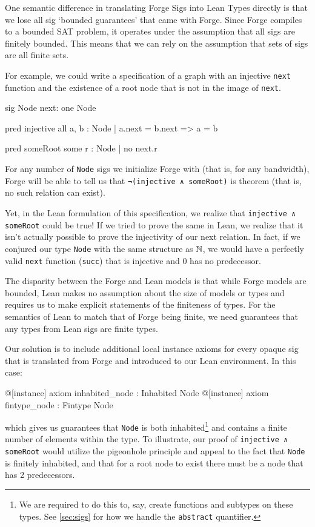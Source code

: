 One semantic difference in translating Forge Sigs into Lean Types directly is that we lose all sig `bounded guarantees' that came with Forge. Since Forge compiles to a bounded SAT problem, it operates under the assumption that all sigs are finitely bounded. This means that we can rely on the assumption that sets of sigs are all finite sets. 

For example, we could write a specification of a graph with an injective \texttt{next} function and the existence of a root node that is not in the image of \texttt{next}. 
\begin{forge*}
sig Node {
  next: one Node
}

pred injective {
  all a, b : Node | 
    a.next = b.next => a = b
}

pred someRoot {
  some r : Node | 
    no next.r
}
\end{forge*}
For any number of \texttt{Node} sigs we initialize Forge with (that is, for any bandwidth), Forge will be able to tell us that \texttt{¬(injective ∧ someRoot)} is theorem (that is, no such relation can exist). 

Yet, in the Lean formulation of this specification, we realize that \texttt{injective ∧ someRoot} could be true! If we tried to prove the same in Lean, we realize that it isn't actually possible to prove the injectivity of our next relation. In fact, if we conjured our type \texttt{Node} with the same structure as $\mathbb N$, we would have a perfectly valid \texttt{next} function (\texttt{succ}) that is injective and $0$ has no predecessor. 

The disparity between the Forge and Lean models is that while Forge models are bounded, Lean makes no assumption about the size of models or types and requires us to make explicit statements of the finiteness of types. For the semantics of Lean to match that of Forge being finite, we need guarantees that any types from Lean sigs are finite types. 

Our solution is to include additional local instance axioms for every opaque sig that is translated from Forge and introduced to our Lean environment. In this case: 
\begin{lean*}
@[instance] axiom inhabited_node : Inhabited Node
@[instance] axiom fintype_node : Fintype Node
\end{lean*}
which gives us guarantees that \texttt{Node} is both inhabited\footnote{We are required to do this to, say, create functions and subtypes on these types. See \cref{sec:sigs} for how we handle the \texttt{abstract} quantifier.} and contains a finite number of elements within the type. To illustrate, our proof of \texttt{injective ∧ someRoot} would utilize the pigeonhole principle and appeal to the fact that \texttt{Node} is finitely inhabited, and that for a root node to exist there must be a node that has 2 predecessors. 

